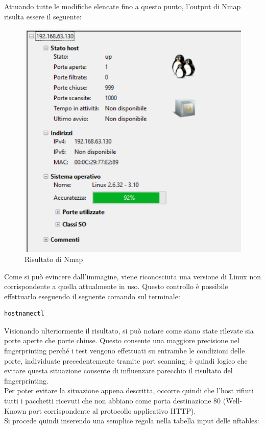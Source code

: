 Attuando tutte le modifiche elencate fino a questo punto, l'output di Nmap risulta essere il seguente:

\begin{figure}[H]
	\centering
	\includegraphics[scale=0.85]{figures/primo_nmap.png}
	\caption{Risultato di Nmap}
	\label{primo_nmap}
\end{figure}

Come si può evincere dall'immagine, viene riconosciuta una versione di Linux non corrispondente a quella attualmente in uso. Questo controllo è possibile effettuarlo eseguendo il seguente comando sul terminale:
\begin{lstlisting}[caption={Comando per mostrare la versione attualmente in uso}]
	hostnamectl
\end{lstlisting}
Visionando ulteriormente il risultato, si può notare come siano state rilevate sia porte aperte che porte chiuse. Questo consente una maggiore precisione nel fingerprinting perché i test vengono effettuati su entrambe le condizioni delle porte, individuate precedentemente tramite port scanning; è quindi logico che evitare questa situazione consente di influenzare parecchio il risultato del fingerprinting.
\\
Per poter evitare la situazione appena descritta, occorre quindi che l'host rifiuti tutti i pacchetti ricevuti che non abbiano come porta destinazione 80 (Well-Known port corrispondente al protocollo applicativo HTTP).
\\
Si procede quindi inserendo una semplice regola nella tabella input delle nftables:

